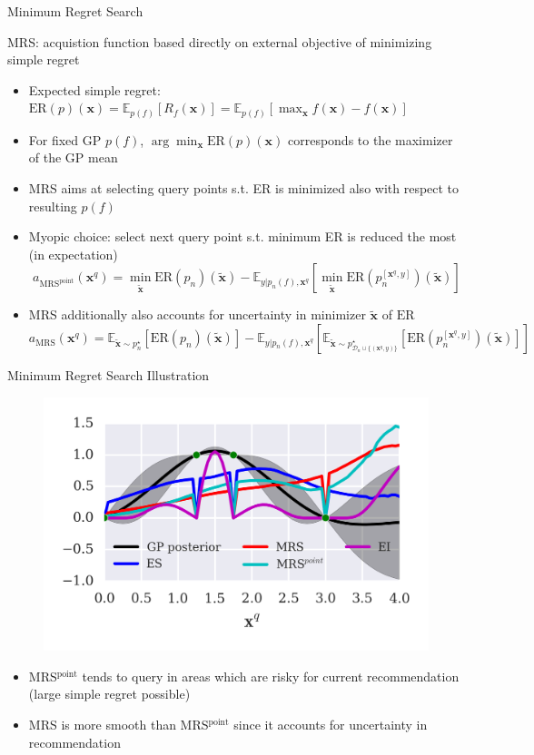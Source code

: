\documentclass[11pt]{beamer}
\begin{document}
\begin{frame}{Minimum Regret Search}

MRS: acquistion function based directly on external objective of minimizing simple regret
\begin{itemize}
 \item Expected simple regret: $\text{ER}(p)(\mathbf{x}) = \mathbb{E}_{p(f)}[R_f(\mathbf{x})]
= \mathbb{E}_{p(f)}[\max_{\mathbf{x}} f(\mathbf{x}) - f(\mathbf{
x})]$
 \item For fixed GP $p(f)$, $\arg\min_\mathbf{x} \text{ER}(p)(\mathbf{x})$ corresponds to the maximizer of the GP mean
 \item MRS aims at selecting query points s.t. ER is minimized also with respect to resulting $p(f)$
 \item Myopic choice: select next query point s.t. minimum ER is reduced the most (in expectation)
  $$a_{\text{MRS}^{\text{point}}}(\mathbf{x}^q)
  = \min_{\mathbf{\tilde x}}\text{ER}(p_n)(\mathbf{\tilde x})
   - \mathbb{E}_{y \vert p_n(f), \mathbf{x}^q}[\min_{\mathbf{\tilde x}}  \text{ER}(p^{[\mathbf{x}^q, y]}_n)(\mathbf{\tilde x})]$$
 \item MRS additionally also accounts for uncertainty in minimizer $\mathbf{\tilde x}$ of $\text{ER}$ 
  $$a_{\text{MRS}}(\mathbf{x}^q)
    = \mathbb{E}_{\mathbf{\tilde x} \sim p^\star_n}[\text{ER}(p_n)(\mathbf{\tilde x})] 
     - \mathbb{E}_{y \vert p_n(f), \mathbf{x}^q}[
      \mathbb{E}_{\mathbf{\tilde x} \sim p^\star_{\mathcal{D}_n \cup \{(\mathbf{x}^q, y)\}}}[
       \text{ER}(p^{[\mathbf{x}^q, y]}_n)(\mathbf{\tilde x})]]$$
\end{itemize}

\end{frame}

\begin{frame}{Minimum Regret Search Illustration}
\begin{figure}
\centering
\includegraphics[width=0.48\columnwidth]{../pics/acq_comparison}
\end{figure}

\begin{itemize}
\item MRS$^\text{point}$ tends to query in areas which are risky for current recommendation (large simple regret possible)
\item MRS is more smooth than MRS$^\text{point}$ since it accounts for uncertainty in recommendation
\end{itemize}

\end{frame}
\end{document}
